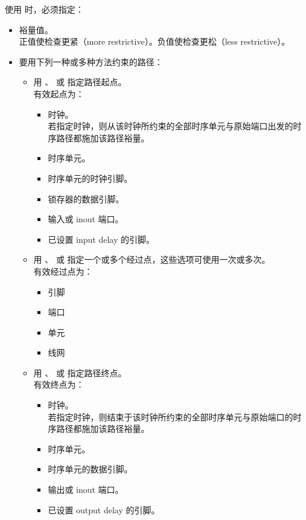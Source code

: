 使用  时，必须指定：
\begin{itemize}
  \item 裕量值。\\
        正值使检查更紧（more restrictive）。负值使检查更松（less restrictive）。
  \item 要用下列一种或多种方法约束的路径：
        \begin{itemize}
          \item 用 、 或  指定路径起点。\\
                有效起点为：
                \begin{itemize}
                  \item 时钟。\\
                        若指定时钟，则从该时钟所约束的全部时序单元与原始端口出发的时序路径都施加该路径裕量。
                  \item 时序单元。
                  \item 时序单元的时钟引脚。
                  \item 锁存器的数据引脚。
                  \item 输入或 inout 端口。
                  \item 已设置 input delay 的引脚。
                \end{itemize}
          \item 用 、 或  指定一个或多个经过点，这些选项可使用一次或多次。\\
                有效经过点为：
                \begin{itemize}
                  \item 引脚
                  \item 端口
                  \item 单元
                  \item 线网
                \end{itemize}
          \item 用 、 或  指定路径终点。\\
                有效终点为：
                \begin{itemize}
                  \item 时钟。\\
                        若指定时钟，则结束于该时钟所约束的全部时序单元与原始端口的时序路径都施加该路径裕量。
                  \item 时序单元。
                  \item 时序单元的数据引脚。
                  \item 输出或 inout 端口。
                  \item 已设置 output delay 的引脚。
                \end{itemize}
        \end{itemize}
\end{itemize}

